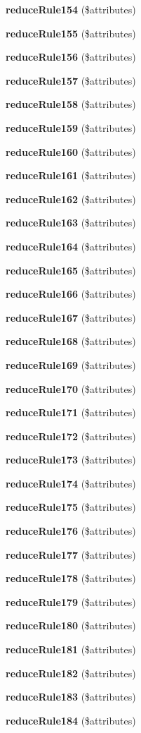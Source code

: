 \begin{DoxyCompactItemize}
\item 
{\bf reduce\+Rule154} (\$attributes)
\item 
{\bf reduce\+Rule155} (\$attributes)
\item 
{\bf reduce\+Rule156} (\$attributes)
\item 
{\bf reduce\+Rule157} (\$attributes)
\item 
{\bf reduce\+Rule158} (\$attributes)
\item 
{\bf reduce\+Rule159} (\$attributes)
\item 
{\bf reduce\+Rule160} (\$attributes)
\item 
{\bf reduce\+Rule161} (\$attributes)
\item 
{\bf reduce\+Rule162} (\$attributes)
\item 
{\bf reduce\+Rule163} (\$attributes)
\item 
{\bf reduce\+Rule164} (\$attributes)
\item 
{\bf reduce\+Rule165} (\$attributes)
\item 
{\bf reduce\+Rule166} (\$attributes)
\item 
{\bf reduce\+Rule167} (\$attributes)
\item 
{\bf reduce\+Rule168} (\$attributes)
\item 
{\bf reduce\+Rule169} (\$attributes)
\item 
{\bf reduce\+Rule170} (\$attributes)
\item 
{\bf reduce\+Rule171} (\$attributes)
\item 
{\bf reduce\+Rule172} (\$attributes)
\item 
{\bf reduce\+Rule173} (\$attributes)
\item 
{\bf reduce\+Rule174} (\$attributes)
\item 
{\bf reduce\+Rule175} (\$attributes)
\item 
{\bf reduce\+Rule176} (\$attributes)
\item 
{\bf reduce\+Rule177} (\$attributes)
\item 
{\bf reduce\+Rule178} (\$attributes)
\item 
{\bf reduce\+Rule179} (\$attributes)
\item 
{\bf reduce\+Rule180} (\$attributes)
\item 
{\bf reduce\+Rule181} (\$attributes)
\item 
{\bf reduce\+Rule182} (\$attributes)
\item 
{\bf reduce\+Rule183} (\$attributes)
\item 
{\bf reduce\+Rule184} (\$attributes)

\end{DoxyCompactItemize}
